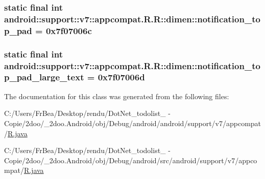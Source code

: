 \hypertarget{classandroid_1_1support_1_1v7_1_1appcompat_1_1_r_1_1dimen_c6efcfc1c5b6b661fa008b16124feb02}{
\subsubsection[{notification\_\-top\_\-pad}]{\setlength{\rightskip}{0pt plus 5cm}static final int android::support::v7::appcompat.R.R::dimen::notification\_\-top\_\-pad = 0x7f07006c}}
\label{classandroid_1_1support_1_1v7_1_1appcompat_1_1_r_1_1dimen_c6efcfc1c5b6b661fa008b16124feb02}


\hypertarget{classandroid_1_1support_1_1v7_1_1appcompat_1_1_r_1_1dimen_28b098b0436bfd9deff632ba3d657dff}{
\subsubsection[{notification\_\-top\_\-pad\_\-large\_\-text}]{\setlength{\rightskip}{0pt plus 5cm}static final int android::support::v7::appcompat.R.R::dimen::notification\_\-top\_\-pad\_\-large\_\-text = 0x7f07006d}}
\label{classandroid_1_1support_1_1v7_1_1appcompat_1_1_r_1_1dimen_28b098b0436bfd9deff632ba3d657dff}




The documentation for this class was generated from the following files:\begin{CompactItemize}
\item 
C:/Users/FrBea/Desktop/rendu/DotNet\_\-todolist\_ - Copie/2doo/\_\-2doo.Android/obj/Debug/android/android/support/v7/appcompat/\hyperlink{android_2support_2v7_2appcompat_2_r_8java}{R.java}\item 
C:/Users/FrBea/Desktop/rendu/DotNet\_\-todolist\_ - Copie/2doo/\_\-2doo.Android/obj/Debug/android/src/android/support/v7/appcompat/\hyperlink{src_2android_2support_2v7_2appcompat_2_r_8java}{R.java}\end{CompactItemize}
